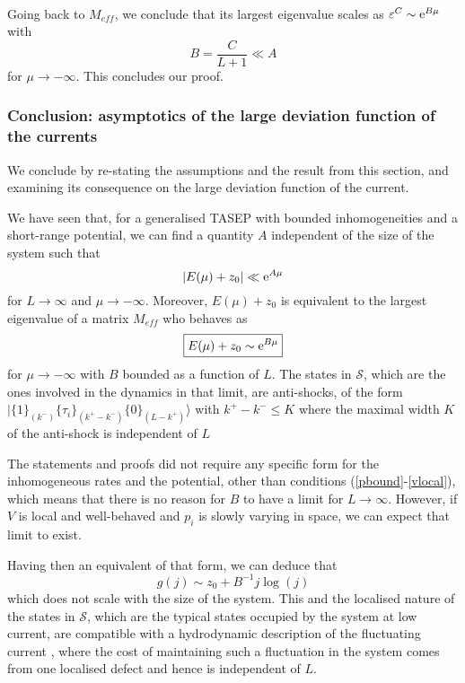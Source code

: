 \documentclass[aps,pre,onecolumn,showpacs,showkeys,a4paper]{revtex4-1}
\begin{document}
~~

Going back to $M_{eff}$, we conclude that its largest eigenvalue scales as $\varepsilon^{C}\sim {\rm e}^{B\mu}$ with
\begin{equation}\boxed{
B=\frac{C}{L+1}\ll A
}\end{equation}
for $\mu\rightarrow-\infty$. This concludes our proof.





\subsubsection{Conclusion: asymptotics of the large deviation function of the currents}
\label{IVc4}

We conclude by re-stating the assumptions and the result from this section, and examining its consequence on the large deviation function of the current.

We have seen that, for a generalised TASEP with bounded inhomogeneities and a short-range potential, we can find a quantity $A$ independent of the size of the system such that 
\begin{equation}
|E(\mu)+z_0|\ll {\rm e}^{A\mu}
\end{equation}
for $L\rightarrow\infty$ and $\mu\rightarrow-\infty$. Moreover, $E(\mu)+z_0$ is equivalent to the largest eigenvalue of a matrix $M_{eff}$ who behaves as
\begin{equation}\boxed{
E(\mu)+z_0\sim {\rm e}^{B\mu}
}\end{equation}
for $\mu\rightarrow-\infty$ with $B$ bounded as a function of $L$. The states in $\mathcal{S}$, which are the ones involved in the dynamics in that limit, are anti-shocks, of the form $|\{1\}_{(k^-)} \{\tau_i\}_{(k^+-k^-)}\{0\}_{(L-k^+)}\rangle$ with $k^+-k^-\leq K$ where the maximal width $K$ of the anti-shock is independent of $L$

The statements and proofs did not require any specific form for the inhomogeneous rates and the potential, other than conditions (\ref{pbound}-\ref{vlocal}), which means that there is no reason for $B$ to have a limit for $L\rightarrow\infty$. However, if $V$ is local and well-behaved and $p_i$ is slowly varying in space, we can expect that limit to exist.

Having then an equivalent of that form, we can deduce that
\begin{equation}\label{LowCurrtEquiv}\boxed{\boxed{
g(j)\sim z_0+B^{-1}j\log(j)
}}\end{equation}
which does not scale with the size of the system. This and the localised nature of the states in $\mathcal{S}$, which are the typical states occupied by the system at low current, are compatible with a hydrodynamic description of the fluctuating current \cite{Bodineau2006,Lazarescu2015}, where the cost of maintaining such a fluctuation in the system comes from one localised defect and hence is independent of $L$.
\end{document}
